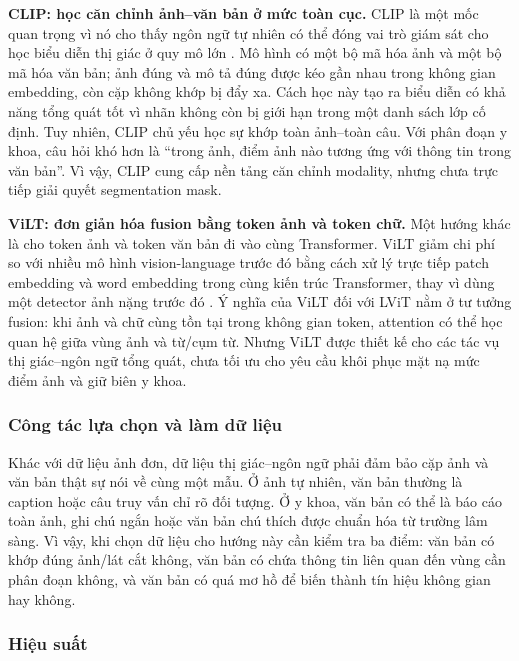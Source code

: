 \textbf{CLIP: học căn chỉnh ảnh--văn bản ở mức toàn cục.} CLIP là một mốc quan trọng vì nó cho thấy ngôn ngữ tự nhiên có thể đóng vai trò giám sát cho học biểu diễn thị giác ở quy mô lớn \cite{radford2021clip}. Mô hình có một bộ mã hóa ảnh và một bộ mã hóa văn bản; ảnh đúng và mô tả đúng được kéo gần nhau trong không gian embedding, còn cặp không khớp bị đẩy xa. Cách học này tạo ra biểu diễn có khả năng tổng quát tốt vì nhãn không còn bị giới hạn trong một danh sách lớp cố định. Tuy nhiên, CLIP chủ yếu học sự khớp toàn ảnh--toàn câu. Với phân đoạn y khoa, câu hỏi khó hơn là ``trong ảnh, điểm ảnh nào tương ứng với thông tin trong văn bản''. Vì vậy, CLIP cung cấp nền tảng căn chỉnh modality, nhưng chưa trực tiếp giải quyết segmentation mask.

\textbf{ViLT: đơn giản hóa fusion bằng token ảnh và token chữ.} Một hướng khác là cho token ảnh và token văn bản đi vào cùng Transformer. ViLT giảm chi phí so với nhiều mô hình vision-language trước đó bằng cách xử lý trực tiếp patch embedding và word embedding trong cùng kiến trúc Transformer, thay vì dùng một detector ảnh nặng trước đó \cite{kim2021vilt}. Ý nghĩa của ViLT đối với LViT nằm ở tư tưởng fusion: khi ảnh và chữ cùng tồn tại trong không gian token, attention có thể học quan hệ giữa vùng ảnh và từ/cụm từ. Nhưng ViLT được thiết kế cho các tác vụ thị giác--ngôn ngữ tổng quát, chưa tối ưu cho yêu cầu khôi phục mặt nạ mức điểm ảnh và giữ biên y khoa.

\subsubsection{Công tác lựa chọn và làm dữ liệu}

Khác với dữ liệu ảnh đơn, dữ liệu thị giác--ngôn ngữ phải đảm bảo cặp ảnh và văn bản thật sự nói về cùng một mẫu. Ở ảnh tự nhiên, văn bản thường là caption hoặc câu truy vấn chỉ rõ đối tượng. Ở y khoa, văn bản có thể là báo cáo toàn ảnh, ghi chú ngắn hoặc văn bản chú thích được chuẩn hóa từ trường lâm sàng. Vì vậy, khi chọn dữ liệu cho hướng này cần kiểm tra ba điểm: văn bản có khớp đúng ảnh/lát cắt không, văn bản có chứa thông tin liên quan đến vùng cần phân đoạn không, và văn bản có quá mơ hồ để biến thành tín hiệu không gian hay không.

\subsubsection{Hiệu suất}

